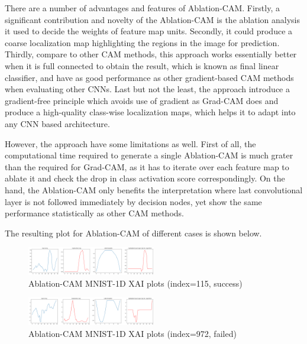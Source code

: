 \documentclass[conference]{IEEEtran}
\begin{document}
There are a number of advantages and features of Ablation-CAM. Firstly, a significant contribution and novelty of the Ablation-CAM is the ablation analysis it used to decide the weights of feature map units. Secondly, it could produce a coarse localization map highlighting the regions in the image for prediction. Thirdly, compare to other CAM methods, this approach works essentially better when it is full connected to obtain the result, which is known as final linear classifier, and have as good performance as other gradient-based CAM methods when evaluating other CNNs. Last but not the least, the approach introduce a gradient-free principle which avoids use of gradient as Grad-CAM does and produce a high-quality class-wise localization maps, which helps it to adapt into any CNN based architecture.\par
However, the approach have some limitations as well. First of all, the computational time required to generate a single Ablation-CAM is much grater than the required for Grad-CAM, as it has to iterate over each feature map to ablate it and check the drop in class activation score correspondingly. 
On the hand, the Ablation-CAM only benefits the interpretation where last convolutional layer is not followed immediately by decision nodes, yet show the same performance statistically as other CAM methods.\par

The resulting plot for Ablation-CAM of different cases is shown below.

\begin{figure}[h] 
    \centering
    \includegraphics[width=0.5\textwidth]{./pics/MNIST-1D/115T-L0P0/ablation.png}
    \caption{Ablation-CAM MNIST-1D XAI plots (index=115, success)} 
\end{figure}

\begin{figure}[h] 
    \centering
    \includegraphics[width=0.5\textwidth]{./pics/MNIST-1D/972F-L9P8/ablation.png}
    \caption{Ablation-CAM MNIST-1D XAI plots (index=972, failed)} 
\end{figure}
\end{document}
